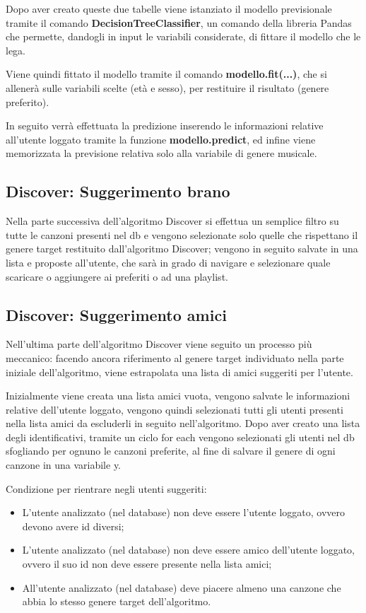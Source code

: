 Dopo aver creato queste due tabelle viene istanziato il modello previsionale tramite il comando \textbf{DecisionTreeClassifier}, un comando 
della libreria Pandas che permette, dandogli in input le variabili considerate, di fittare il modello che le lega. 

Viene quindi fittato il modello tramite il comando \textbf{modello.fit(...)}, che si allenerà sulle variabili scelte (età e sesso), per restituire 
il risultato (genere preferito). 

In seguito verrà effettuata la predizione inserendo le informazioni relative all'utente loggato tramite la funzione \textbf{modello.predict}, ed 
infine viene memorizzata la previsione relativa solo alla variabile di genere musicale. 



\subsection{Discover: Suggerimento brano}
Nella parte successiva dell'algoritmo Discover si effettua un semplice filtro su tutte le canzoni presenti nel db e vengono
 selezionate solo quelle che rispettano il genere target restituito dall'algoritmo Discover; vengono in seguito salvate in una 
 lista e proposte all'utente, che sarà in grado di navigare e selezionare quale scaricare o aggiungere ai preferiti o ad una playlist. 

\subsection{Discover: Suggerimento amici}
Nell'ultima parte dell'algoritmo Discover viene seguito un processo più meccanico: facendo ancora riferimento al genere target 
individuato nella parte iniziale dell'algoritmo, viene estrapolata una lista di amici suggeriti per l'utente. 

Inizialmente viene creata una lista amici vuota, vengono salvate le informazioni relative dell'utente loggato, vengono quindi 
selezionati tutti gli utenti presenti nella lista amici da escluderli in seguito nell'algoritmo.
Dopo aver creato una lista degli identificativi, tramite un ciclo for each vengono selezionati gli utenti nel db 
sfogliando per ognuno le canzoni preferite, al fine di salvare il genere di ogni canzone in una variabile y.

Condizione per rientrare negli utenti suggeriti:
\begin{itemize}
    \item L'utente analizzato (nel database) non deve essere l'utente loggato, ovvero devono avere id diversi;
    \item L'utente analizzato (nel database) non deve essere amico dell'utente loggato, ovvero il suo id non deve essere presente 
    nella lista amici;
    \item All'utente analizzato (nel database) deve piacere almeno una canzone che abbia lo stesso genere target dell'algoritmo.

\end{itemize}

